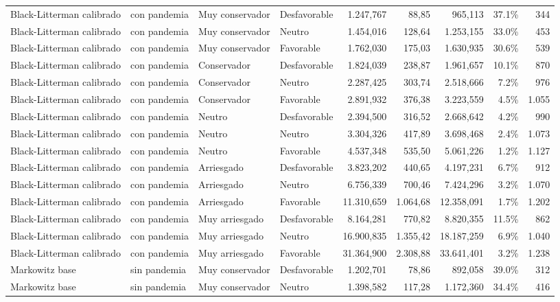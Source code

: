 \documentclass[11pt]{article}
\begin{document}
\begin{table}[H]
{\begin{tabular}{llllrrrrr}
Black-Litterman calibrado & con pandemia & Muy conservador & Desfavorable & 1.247,767 & 88,85 & 965,113 & 37.1\% & 344 \\
Black-Litterman calibrado & con pandemia & Muy conservador & Neutro & 1.454,016 & 128,64 & 1.253,155 & 33.0\% & 453 \\
Black-Litterman calibrado & con pandemia & Muy conservador & Favorable & 1.762,030 & 175,03 & 1.630,935 & 30.6\% & 539 \\
Black-Litterman calibrado & con pandemia & Conservador & Desfavorable & 1.824,039 & 238,87 & 1.961,657 & 10.1\% & 870 \\
Black-Litterman calibrado & con pandemia & Conservador & Neutro & 2.287,425 & 303,74 & 2.518,666 & 7.2\% & 976 \\
Black-Litterman calibrado & con pandemia & Conservador & Favorable & 2.891,932 & 376,38 & 3.223,559 & 4.5\% & 1.055 \\
Black-Litterman calibrado & con pandemia & Neutro & Desfavorable & 2.394,500 & 316,52 & 2.668,642 & 4.2\% & 990 \\
Black-Litterman calibrado & con pandemia & Neutro & Neutro & 3.304,326 & 417,89 & 3.698,468 & 2.4\% & 1.073 \\
Black-Litterman calibrado & con pandemia & Neutro & Favorable & 4.537,348 & 535,50 & 5.061,226 & 1.2\% & 1.127 \\
Black-Litterman calibrado & con pandemia & Arriesgado & Desfavorable & 3.823,202 & 440,65 & 4.197,231 & 6.7\% & 912 \\
Black-Litterman calibrado & con pandemia & Arriesgado & Neutro & 6.756,339 & 700,46 & 7.424,296 & 3.2\% & 1.070 \\
Black-Litterman calibrado & con pandemia & Arriesgado & Favorable & 11.310,659 & 1.064,68 & 12.358,091 & 1.7\% & 1.202 \\
Black-Litterman calibrado & con pandemia & Muy arriesgado & Desfavorable & 8.164,281 & 770,82 & 8.820,355 & 11.5\% & 862 \\
Black-Litterman calibrado & con pandemia & Muy arriesgado & Neutro & 16.900,835 & 1.355,42 & 18.187,259 & 6.9\% & 1.040 \\
Black-Litterman calibrado & con pandemia & Muy arriesgado & Favorable & 31.364,900 & 2.308,88 & 33.641,401 & 3.2\% & 1.238 \\
Markowitz base & sin pandemia & Muy conservador & Desfavorable & 1.202,701 & 78,86 & 892,058 & 39.0\% & 312 \\
Markowitz base & sin pandemia & Muy conservador & Neutro & 1.398,582 & 117,28 & 1.172,360 & 34.4\% & 416 \\

\end{tabular}}
\end{table}
\end{document}
